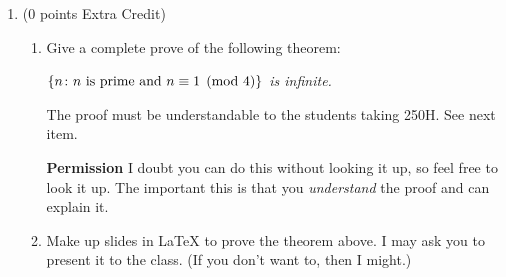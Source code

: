 \documentclass[12pt]{article}
\begin{document}
\begin{enumerate}
\begin{enumerate}
(Hint: Use Part 3.) 
\begin{itemize}
    \item \textbf{The base case is when n is equal to 0. When this occurs, the $4^n$ term is equal to 1, and we're just left with some multiple of 8 plus 7, which was provied in part 2 to not be able to be written as the sum of three squares. For the induction hypothesis, we can assume that for some n greater than or equal to 0, and for some k which is part of the set of natural numbers, $4^n(8k+7)$ can't be written as the sum of 3 squares. We induct and try to prove that $4^{n+1}(8k+7)$ can't be written as the sum of 3 squares. This expression can be rewritten as $4(4^n(8k+7))$. For the sake of contradiction, assume that this expression CAN be written as the sum of three squares. Further, since a 4 exists as a factor, it can be written in the form of part c, and each number is even, it can be written with a coefficient of 2. Squaring this for each term gives us a coefficient of 4 outside the whole term, meaning that the 4 can cancel with the left side' expression, leaving us with $4^n(8k+7) = x^2 + y^2 + z^2$. Yet, since we provied in our induction hypothesis that $4^n(8k+7)$ can't be written as the sum of three squares, we have a contradiction, meaning that our assumption that $4^{n+1}(8k+7)$ can be written as the sum of three squares is false, and therefore $4^{n+1}(8k+7)$ can't be written as the sum of three squares, proving the induction step and the statement.}
\end{itemize}

\end{enumerate}

\vfill

\centerline{\bf GO TO NEXT PAGE}

\newpage

\item 
(0 points Extra Credit)
\begin{enumerate}
\item
Give a complete prove of the following theorem: 

{\it $\{ n \colon \hbox{$n$ is prime and } n\equiv 1 \pmod 4 \}$ is infinite.}

The proof must be understandable to the students taking 250H. See next item. 

{\bf Permission} I doubt you can do this without looking it up, so feel
free to look it up. The important this is that you {\it understand} the
proof and can explain it.

\item
Make up slides in LaTeX to prove the theorem above. I may ask you to
present it to the class. (If you don't want to, then I might.) 

\end{enumerate} 

\end{enumerate}
\end{document}
